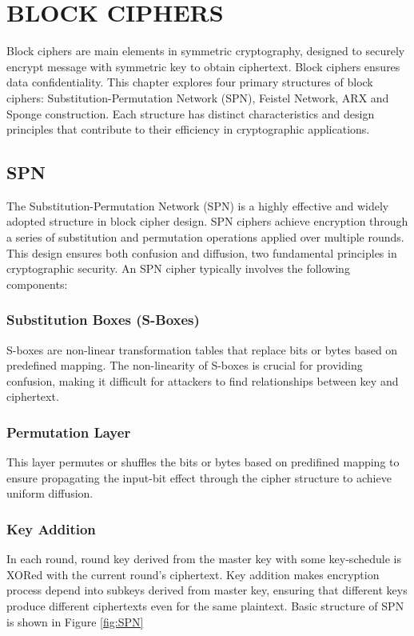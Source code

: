 \chapter{BLOCK CIPHERS}\label{blockCiphers}
Block ciphers are main elements in symmetric cryptography, designed to securely encrypt message with symmetric key to obtain ciphertext. Block ciphers ensures data confidentiality. This chapter explores four primary structures of block ciphers: Substitution-Permutation Network (SPN), Feistel Network, ARX and Sponge construction. Each structure has distinct characteristics and design principles that contribute to their efficiency in cryptographic applications. 
\section{SPN}

The Substitution-Permutation Network (SPN) is a highly effective and widely adopted structure in block cipher design. SPN ciphers achieve encryption through a series of substitution and permutation operations applied over multiple rounds. This design ensures both confusion and diffusion, two fundamental principles in cryptographic security. An SPN cipher typically involves the following components:

\subsection{Substitution Boxes (S-Boxes)}
S-boxes are non-linear transformation tables that replace bits or bytes based on predefined mapping. The non-linearity of S-boxes is crucial for providing confusion, making it difficult for attackers to find relationships between key and ciphertext.

\subsection{Permutation Layer}
This layer permutes or shuffles the bits or bytes based on predifined mapping to ensure propagating the input-bit effect through the cipher structure to achieve uniform diffusion. 

\newpage
\subsection{Key Addition}
In each round, round key derived from the master key with some key-schedule is XORed with the current round's ciphertext. Key addition makes encryption process depend into subkeys derived from master key, ensuring that different keys produce different ciphertexts even for the same plaintext. Basic structure of SPN is shown in Figure \ref{fig:SPN} 


